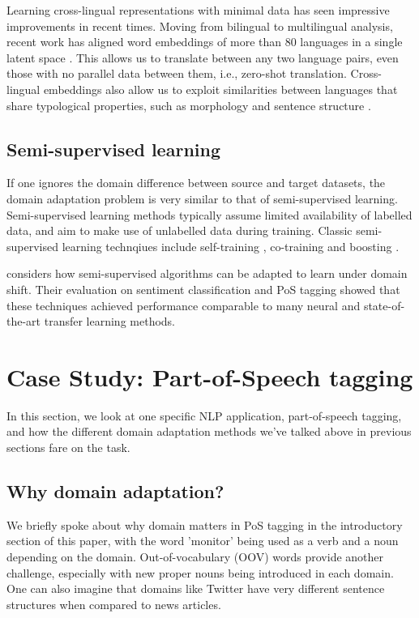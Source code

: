 \documentclass[12pt]{report}
\begin{document}
	Learning cross-lingual representations with minimal data has seen impressive improvements in recent times. Moving from bilingual to multilingual analysis, recent work has aligned word embeddings of more than 80 languages in a single latent space \citep{conneau2017word}. This allows us to translate between any two language pairs, even those with no parallel data between them, i.e., zero-shot translation. Cross-lingual embeddings also allow us to exploit similarities between languages that share typological properties, such as morphology and sentence structure \citep{johnson2017google}. 
	
	\subsection{Semi-supervised learning}
	If one ignores the domain difference between source and target datasets, the domain adaptation problem is very similar to that of semi-supervised learning. Semi-supervised learning methods typically assume limited availability of labelled data, and aim to make use of unlabelled data during training. Classic semi-supervised learning technqiues include self-training \citep{yarowsky1995unsupervised}, co-training \citep{blum1998combining} and boosting \citep{mallapragada2009semiboost}. \par
	\citep{ruder2018strong} considers how semi-supervised algorithms can be adapted to learn under domain shift. Their evaluation on sentiment classification and PoS tagging showed that these techniques achieved performance comparable to many neural and state-of-the-art transfer learning methods.
	
	
	
	\section{Case Study: Part-of-Speech tagging}
	\label{app}
	
	In this section, we look at one specific NLP application, part-of-speech tagging, and how the different domain adaptation methods we've talked above in previous sections fare on the task.
	\subsection{Why domain adaptation?}
	We briefly spoke about why domain matters in PoS tagging in the introductory section of this paper, with the word 'monitor' being used as a verb and a noun depending on the domain. Out-of-vocabulary (OOV) words provide another challenge, especially with new proper nouns being introduced in each domain. One can also imagine that domains like Twitter have very different sentence structures when compared to news articles.
	
\end{document}
